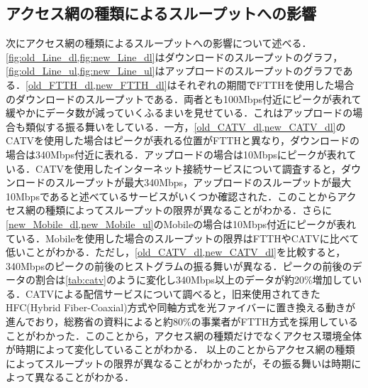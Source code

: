 \subsection{アクセス網の種類によるスループットへの影響}
次にアクセス網の種類によるスループットへの影響について述べる．\cref{fig:old_Line_dl,fig:new_Line_dl}はダウンロードのスループットのグラフ，\cref{fig:old_Line_ul,fig:new_Line_ul}はアップロードのスループットのグラフである．\cref{old_FTTH_dl,new_FTTH_dl}はそれぞれの期間でFTTHを使用した場合のダウンロードのスループットである．両者とも100Mbps付近にピークが表れて緩やかにデータ数が減っていくふるまいを見せている．これはアップロードの場合も類似する振る舞いをしている．一方，\cref{old_CATV_dl,new_CATV_dl}のCATVを使用した場合はピークが表れる位置がFTTHと異なり，ダウンロードの場合は340Mbps付近に表れる．アップロードの場合は10Mbpsにピークが表れている．CATVを使用したインターネット接続サービスについて調査すると，ダウンロードのスループットが最大340Mbps，アップロードのスループットが最大10Mbpsであると述べているサービスがいくつか確認された．このことからアクセス網の種類によってスループットの限界が異なることがわかる．さらに\cref{new_Mobile_dl,new_Mobile_ul}のMobileの場合は10Mbps付近にピークが表れている．Mobileを使用した場合のスループットの限界はFTTHやCATVに比べて低いことがわかる．ただし，\cref{old_CATV_dl,new_CATV_dl}を比較すると，340Mbpsのピークの前後のヒストグラムの振る舞いが異なる．ピークの前後のデータの割合は\cref{tab:catv}のように変化し340Mbps以上のデータが約20\%増加している．CATVによる配信サービスについて調べると，旧来使用されてきたHFC(Hybrid Fiber-Coaxial)方式や同軸方式を光ファイバーに置き換える動き\cite{nagaoka}が進んでおり，総務省の資料\cite{catv}によると約80\%の事業者がFTTH方式を採用していることがわかった．このことから，アクセス網の種類だけでなくアクセス環境全体が時期によって変化していることがわかる．
以上のことからアクセス網の種類によってスループットの限界が異なることがわかったが，その振る舞いは時期によって異なることがわかる．

